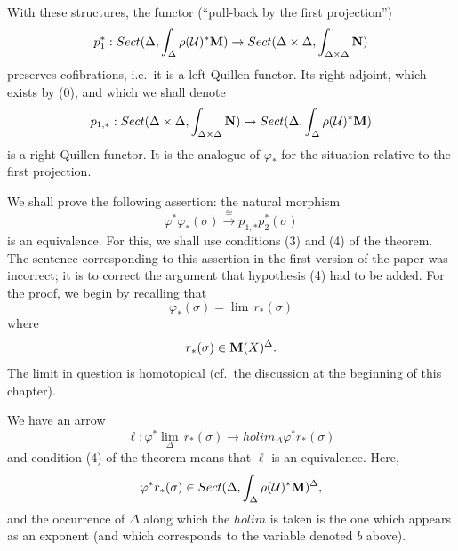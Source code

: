 With these structures, the functor (``pull-back by the first projection'')
$$
p_1^{\ast} : Sect (\Delta , \int _{\Delta} \rho ({\cal U} )^{\ast} {\bf M} )
\rightarrow
Sect (\Delta \times \Delta ,
\int _{\Delta \times \Delta}{\bf N} )
$$
preserves cofibrations, i.e.\ it is a left Quillen functor.
Its right adjoint, which exists by (0), and which we shall denote
$$
p _{1,\ast}: Sect (\Delta \times \Delta ,
\int _{\Delta \times \Delta}{\bf N} )\rightarrow
Sect (\Delta , \int _{\Delta} \rho ({\cal U} )^{\ast} {\bf M} )
$$
is a right Quillen functor. It is
the analogue of $\varphi _{\ast}$ for the situation relative to the
first projection.


We shall prove the following assertion:
the natural
morphism
$$
\varphi ^{\ast} \varphi _{\ast} (\sigma )\stackrel{\cong}{\rightarrow}
p _{1,\ast}p_2^{\ast} (\sigma )
$$
is an equivalence. For this, we shall use
conditions (3) and (4) of the theorem.
The sentence corresponding to this assertion in the first version
of the paper was incorrect; it is to correct the argument that
hypothesis (4) had to be added. For the proof, we begin by recalling that
$$
\varphi _{\ast} ( \sigma ) = \lim \, r_{\ast} (\sigma )
$$
where
$$
r_{\ast} (\sigma ) \in {\bf M} (X) ^{\Delta} .
$$
The limit in question is homotopical (cf.\ the discussion at the beginning
of this chapter).


We have an arrow
$$
\ell : \varphi ^{\ast} \lim _{\Delta}\, r_{\ast} (\sigma ) \rightarrow
holim _{\Delta} \varphi ^{\ast} r_{\ast} (\sigma )
$$
and condition (4) of the theorem means that $\ell$
is an equivalence. Here,
$$
\varphi ^{\ast}r_{\ast} (\sigma ) \in
Sect (\Delta , \int _{\Delta}\rho ({\cal U} )^{\ast} {\bf M} )^{\Delta},
$$
and the occurrence of $\Delta$ along which the $holim$ is taken is the one
which appears as an exponent
(and which corresponds to the variable denoted $b$ above).

